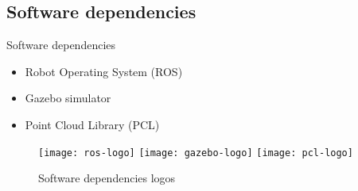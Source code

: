 \subsection{Software dependencies}
\begin{frame}{Software dependencies}
	\begin{itemize}
		\item Robot Operating System (ROS)
		\item Gazebo simulator
		\item Point Cloud Library (PCL)
	\end{itemize}
	\begin{figure}[!ht]
		\centering
		\texttt{[image: ros-logo]}
		\hspace{0.5em}
		\texttt{[image: gazebo-logo]}
		\hspace{0.5em}
		\texttt{[image: pcl-logo]}
		\caption{Software dependencies logos}
	\end{figure}
\end{frame}
